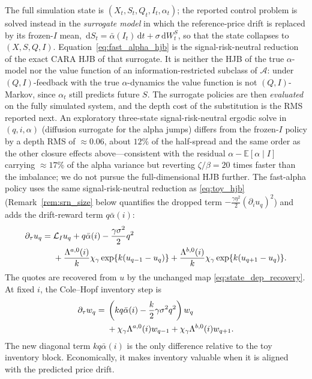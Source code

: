 \documentclass[11pt,a4paper]{article}
\newcommand{\E}{\mathbb{E}}
\newcommand{\Lcal}{\mathcal{L}}
\newcommand{\Acal}{\mathcal{A}}
\newcommand{\dd}{\,\mathrm{d}}
\newcommand{\alphabar}{\bar\alpha}
\theoremstyle{plain}
\theoremstyle{definition}
\begin{document}
The full simulation state is \((X_t,S_t,Q_t,I_t,\alpha_t)\); the reported
control problem is solved instead in the \emph{surrogate model} in which the
reference-price drift is replaced by its frozen-\(I\) mean,
\(\dd S_t=\alphabar(I_t)\dd t+\sigma\dd W^S_t\), so that the state collapses to
\((X,S,Q,I)\).  Equation~\eqref{eq:fast_alpha_hjb} is the signal-risk-neutral
reduction of the exact CARA HJB of that surrogate.  It is neither the HJB of the
true \(\alpha\)-model nor the value function of an information-restricted
subclass of \(\Acal\): under \((Q,I)\)-feedback with the true \(\alpha\)-dynamics
the value function is not \((Q,I)\)-Markov, since \(\alpha_t\) still predicts
future \(S\).  The surrogate policies are then \emph{evaluated} on the fully
simulated system, and the depth cost of the substitution is the RMS reported
next.  An exploratory three-state
signal-risk-neutral ergodic solve in \((q,i,\alpha)\) (diffusion surrogate for
the alpha jumps) differs from the frozen-\(I\) policy by a depth RMS of
\(\approx0.06\), about \(12\%\) of the half-spread and the same order as the
other closure effects above---consistent with the residual
\(\alpha-\E[\alpha\mid I]\) carrying \(\approx17\%\) of the alpha variance but
reverting \(\zeta/\beta=20\) times faster than the imbalance; we do not pursue
the full-dimensional HJB further.  The fast-alpha policy uses the same
signal-risk-neutral reduction as \eqref{eq:toy_hjb}
(Remark~\ref{rem:srn_size} below quantifies the dropped term
\(-\tfrac{\gamma\eta^2}{2}(\partial_iu_q)^2\)) and adds the drift-reward term \(q\alphabar(i)\):
\begin{align}
\partial_\tau u_q
={}&
\Lcal_I u_q
+q\alphabar(i)
-\frac{\gamma\sigma^2}{2}q^2
\notag\\
&+
\frac{\Lambda^{a,0}(i)}{k}
\chi_\gamma
\exp\{k(u_{q-1}-u_q)\}
+
\frac{\Lambda^{b,0}(i)}{k}
\chi_\gamma
\exp\{k(u_{q+1}-u_q)\}.
\label{eq:fast_alpha_hjb}
\end{align}
The quotes are recovered from \(u\) by the unchanged map
\eqref{eq:state_dep_recovery}.
At fixed \(i\), the Cole--Hopf inventory step is
\begin{align}
\partial_\tau w_q
={}&
\left(kq\alphabar(i)-\frac{k}{2}\gamma\sigma^2q^2\right)w_q
\notag\\
&+
\chi_\gamma
\Lambda^{a,0}(i)w_{q-1}
+
\chi_\gamma
\Lambda^{b,0}(i)w_{q+1}.
\label{eq:fast_alpha_w}
\end{align}
The new diagonal term \(kq\alphabar(i)\) is the only difference relative to
the toy inventory block.  Economically, it makes inventory valuable when it is
aligned with the predicted price drift.
\end{document}
